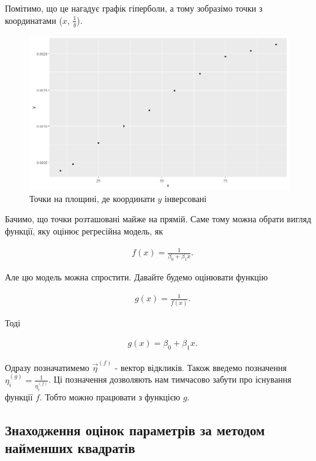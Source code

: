 \documentclass[14pt,a4paper]{scrartcl}
\theoremstyle{definition}
\theoremstyle{remark}
\theoremstyle{definition}
\theoremstyle{definition}
\begin{document}
Помітимо, що це нагадує графік гіперболи, а тому зобразімо точки з координатами ($x$, $\frac{1}{y}$).

\begin{figure}[H]
  \includegraphics[width=\linewidth]{Inv_Plot.png}
  \caption{Точки на площині, де координати $y$ інверсовані}
  \label{fig:image2}
\end{figure}

Бачимо, що точки розташовані майже на прямій. Саме тому можна обрати вигляд функції, яку оцінює регресійна модель, як

\begin{align*}
  & f(x) = \frac{1}{\beta_{0} + \beta_{1} x}.
\end{align*}

Але цю модель можна спростити. Давайте будемо оцінювати функцію

\begin{align*}
  & g(x) = \frac{1}{f(x)}.
\end{align*}

Тоді

\begin{align*}
  & g(x) = \beta_{0} + \beta_{1} x.
\end{align*}

Одразу позначатимемо $\vec{\eta}^{(f)}$ - вектор відкликів. Також введемо позначення $\eta_{i}^{(g)} = \frac{1}{\eta_{i}^{(f)}}$. Ці позначення дозволяють нам тимчасово забути про існування функції $f$. Тобто можно працювати з функцією $g$.

\subsection{Знаходження оцінок параметрів за методом найменших квадратів}
\end{document}
